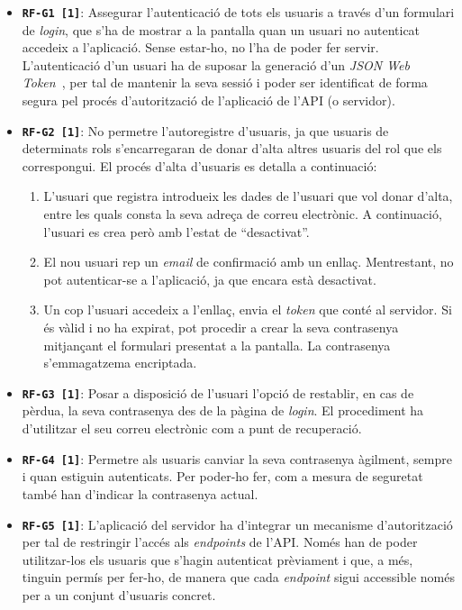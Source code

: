 \documentclass[a4paper,12pt]{ThesisStyle}
\begin{document}
\begin{itemize}
  \item \texttt{\textbf{RF-G1 [1]}}: Assegurar l'autenticació de tots els usuaris a través d'un formulari de \textit{login}, que s'ha de mostrar a la pantalla quan un usuari no autenticat accedeix a l'aplicació. Sense estar-ho, no l'ha de poder fer servir. L'autenticació d'un usuari ha de suposar la generació d'un \textit{JSON Web Token}~\cite{JWT}, per tal de mantenir la seva sessió i poder ser identificat de forma segura pel procés d'autorització de l'aplicació de l'API (o servidor).
  \item \texttt{\textbf{RF-G2 [1]}}: No permetre l'autoregistre d'usuaris, ja que usuaris de determinats rols s'encarregaran de donar d'alta altres usuaris del rol que els correspongui. El procés d'alta d'usuaris es detalla a continuació:
        \begin{enumerate}
          \item L'usuari que registra introdueix les dades de l'usuari que vol donar d'alta, entre les quals consta la seva adreça de correu electrònic. A continuació, l'usuari es crea però amb l'estat de ``desactivat''.
          \item El nou usuari rep un \textit{email} de confirmació amb un enllaç. Mentrestant, no pot autenticar-se a l'aplicació, ja que encara està desactivat.
          \item Un cop l'usuari accedeix a l'enllaç, envia el \textit{token} que conté al servidor. Si és vàlid i no ha expirat, pot procedir a crear la seva contrasenya mitjançant el formulari presentat a la pantalla. La contrasenya s'emmagatzema encriptada.
        \end{enumerate}
  \item \texttt{\textbf{RF-G3 [1]}}: Posar a disposició de l'usuari l'opció de restablir, en cas de pèrdua, la seva contrasenya des de la pàgina de \textit{login}. El procediment ha d'utilitzar el seu correu electrònic com a punt de recuperació.
  \item \texttt{\textbf{RF-G4 [1]}}: Permetre als usuaris canviar la seva contrasenya àgilment, sempre i quan estiguin autenticats. Per poder-ho fer, com a mesura de seguretat també han d'indicar la contrasenya actual.
  \item \texttt{\textbf{RF-G5 [1]}}: L'aplicació del servidor ha d'integrar un mecanisme d'autorització per tal de restringir l'accés als \textit{endpoints} de l'API. Només han de poder utilitzar-los els usuaris que s'hagin autenticat prèviament i que, a més, tinguin permís per fer-ho, de manera que cada \textit{endpoint} sigui accessible només per a un conjunt d'usuaris concret.

\end{itemize}
\end{document}
